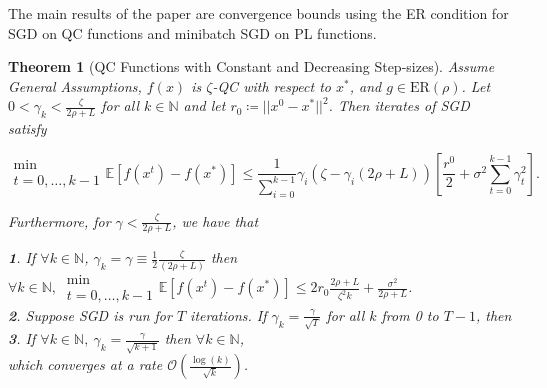 \documentclass{article}
\newtheorem{theorem}{Theorem}[section]
\begin{document}
The main results of the paper are convergence bounds using the ER condition for SGD on QC functions and minibatch SGD on PL functions.
\begin{theorem}[QC Functions with Constant and Decreasing Step-sizes]
	Assume \textit{General Assumptions}, $f(x)$ is $\zeta$-QC with respect to $x^*$, and $g\in\text{ER}(\rho)$. Let $0 < \gamma_k < \frac{\zeta}{2\rho + L}$ for all $k\in\mathbb{N}$ and let $r_0\coloneqq ||x^0 - x^*||^2$.
	Then iterates of SGD satisfy

	\[
		\substack{\min \\ t=0,\dots, k-1}\mathbb{E}\left[f(x^t) - f(x^*)\right] \leq \frac{1}{\sum_{i=0}^{k-1}}\gamma_i (\zeta - \gamma_i (2\rho + L)) \left[\frac{r^0}{2} + \sigma^2 \sum^{k-1}_{t=0}\gamma_t^2\right].
	\]

	Furthermore, for $\gamma < \frac{\zeta}{2\rho + L}$, we have that

	\textbf{1}. If $\forall k\in\mathbb{N}$, $\gamma_k = \gamma \equiv \frac{1}{2}\frac{\zeta}{(2\rho + L)}$ then $\forall k\in\mathbb{N},\ \substack{\min \\ t=0,\dots, k-1}\mathbb{E}[f(x^t) - f(x^*)]\leq 2r_0 \frac{2\rho + L}{\zeta^2 k} + \frac{\sigma^2}{2\rho + L}$. \\
	\textbf{2}. Suppose SGD is run for $T$ iterations. If $\gamma_k = \frac{\gamma}{\sqrt{T}}$ for all $k$ from 0 to $T-1$, then
	\textbf{3}. If $\forall k\in\mathbb{N},\ \gamma_k = \frac{\gamma}{\sqrt{k+1}}$ then $\forall k \in\mathbb{N}$, \\
	which converges at a rate $\mathcal{O}\left(\frac{\log(k)}{\sqrt{k}}\right)$.
\end{theorem}
\end{document}
